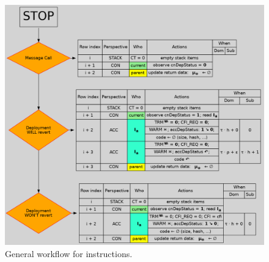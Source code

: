 \begin{figure}[!ht]
\centering
\includegraphics[width=\textwidth]{instruction_handling/halt/flowcharts/stop.png}
	\caption{General workflow for  instructions.}
\label{fig: hub: halt: stop processing}
\end{figure}
